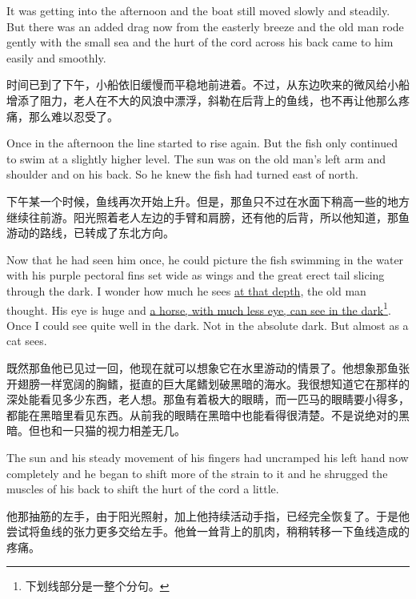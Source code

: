 \begin{paracol}{2}
\switchcolumn*

It was getting into the afternoon and the boat still moved slowly and
steadily. But there was an added drag now from the easterly breeze and the
old man rode gently with the small sea and the hurt of the cord across his
back came to him easily and smoothly.

\switchcolumn

时间已到了下午，小船依旧缓慢而平稳地前进着。不过，从东边吹来的微风给小船增添了阻力，老人在不大的风浪中漂浮，斜勒在后背上的鱼线，也不再让他那么疼痛，那么难以忍受了。

\switchcolumn*

Once in the afternoon the line started to rise again. But the fish only
continued to swim at a \gls{slightly} higher level. The sun was on the old
man's left arm and shoulder and on his back. So he knew the fish had turned
east of north.

\switchcolumn

下午某一个时候，鱼线再次开始上升。但是，那鱼只不过在水面下稍高一些的地方继续往前游。阳光照着老人左边的手臂和肩膀，还有他的后背，所以他知道，那鱼游动的路线，已转成了东北方向。

\switchcolumn*

Now that he had seen him once, he could picture the fish swimming in the
water with his purple pectoral fins set wide as wings and the great
\gls{erect} tail \gls{slicing} through the dark. I wonder how much he sees
\uline{at that depth}, the old man thought. His eye is huge and \uline{a horse, with
  much less eye, can see in the dark}\footnote{下划线部分是一整个分句。}.
Once I could see quite well in the dark. Not in the \gls{absolute} dark. But
almost as a cat sees.

\switchcolumn

既然那鱼他已见过一回，他现在就可以想象它在水里游动的情景了。他想象那鱼张开翅膀一样宽阔的胸鳍，挺直的巨大尾鳍划破黑暗的海水。我很想知道它在那样的深处能看见多少东西，老人想。那鱼有着极大的眼睛，而一匹马的眼睛要小得多，都能在黑暗里看见东西。从前我的眼睛在黑暗中也能看得很清楚。不是说绝对的黑暗。但也和一只猫的视力相差无几。

\switchcolumn*

The sun and his steady movement of his fingers had uncramped his left hand
now completely and he began to shift more of the strain to it and he
\gls{shrugged} the \glspl{muscle} of his back to shift the hurt of the cord
a little.

\switchcolumn

他那抽筋的左手，由于阳光照射，加上他持续活动手指，已经完全恢复了。于是他尝试将鱼线的张力更多交给左手。他耸一耸背上的肌肉，稍稍转移一下鱼线造成的疼痛。


\end{paracol}
